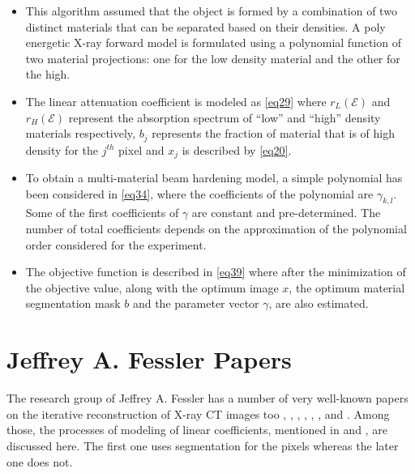 \begin{itemize}

  \item This algorithm assumed that the object  is formed by a combination of two distinct materials that can be separated based on their densities. A poly energetic X-ray forward model is formulated using a polynomial function of two material projections: one for the low density material and the other for the high.
  
  \item The linear attenuation coefficient is modeled as \ref{eq29} where $r_L(\mathcal{E})$ and $r_H(\mathcal{E})$ represent  the absorption spectrum of ``low'' and ``high'' density materials respectively, $b_j$ represents the fraction of material that is of high density for the $j^{th}$ pixel and $x_j$ is described by \ref{eq20}.
  
  \item To obtain a multi-material beam hardening model, a simple polynomial has been considered in \ref{eq34}, where the coefficients of the polynomial are $\gamma_{k,l}$. Some of the first coefficients of $\gamma$ are constant and pre-determined. The number of total coefficients depends on the approximation of the polynomial order considered for the experiment.
  
  \item The objective function is described in \ref{eq39} where after the minimization of the objective value, along with the optimum image $x$, the optimum material segmentation mask $b$ and the parameter vector $\gamma$, are also estimated.
   
\end{itemize}


\section{Jeffrey A. Fessler Papers}

The research group of Jeffrey A. Fessler has a number of very well-known papers on the iterative reconstruction of X-ray CT images too \cite{erdogan1999ordered}, \cite{erdogan2002monotonic}, \cite{elbakri2001statistical}, \cite{elbakri2002statistical}, \cite{elbakri2003segmentation}, \cite{srivastava2005simplified}, \cite{abella2009new} and \cite{fessler1998paraboloidal}. Among those, the processes of modeling of linear coefficients, mentioned in \cite{elbakri2002statistical} and \cite{elbakri2003segmentation}, are discussed here. The first one uses segmentation for the pixels whereas the later one does not.

